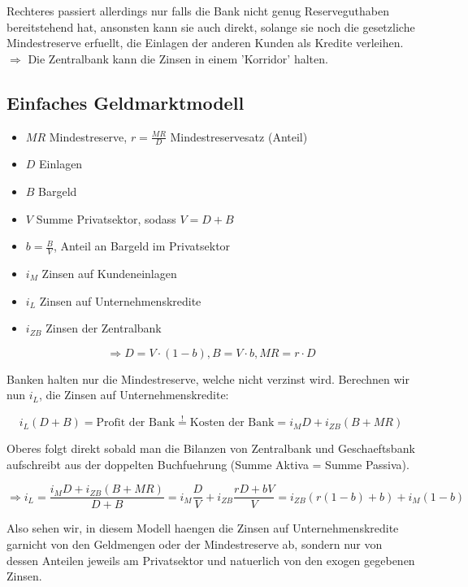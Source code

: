 \documentclass[a4paper]{article}
\begin{document}
Rechteres passiert allerdings nur falls die Bank nicht genug Reserveguthaben
bereitstehend hat, ansonsten kann sie auch direkt,
solange sie noch die gesetzliche Mindestreserve erfuellt,
die Einlagen der anderen Kunden als Kredite verleihen. \\

$\Rightarrow$ Die Zentralbank kann die Zinsen in einem 'Korridor' halten.

\subsection{Einfaches Geldmarktmodell}

\begin{itemize}
	\item $MR$ Mindestreserve, $r = \frac{ MR }{ D }$ Mindestreservesatz (Anteil)
	\item $D$ Einlagen
	\item $B$ Bargeld
	\item $V$ Summe Privatsektor, sodass $V = D + B$
	\item $b = \frac{ B }{ V }$, Anteil an Bargeld im Privatsektor
	\item $i_M$ Zinsen auf Kundeneinlagen
	\item $i_L$ Zinsen auf Unternehmenskredite
	\item $i_{ZB}$ Zinsen der Zentralbank
\end{itemize}

\[
	\Rightarrow
	D = V \cdot (1 - b),
	B = V \cdot b,
	MR = r \cdot D
\]

Banken halten nur die Mindestreserve, welche nicht verzinst wird.
Berechnen wir nun $i_L$, die Zinsen auf Unternehmenskredite:

\[
	i_L (D + B) = \text{Profit der Bank}
	\overset{!} =
	\text{Kosten der Bank}
	=
	i_M D + i_{ZB} (B + MR)
\]

Oberes folgt direkt sobald man die Bilanzen von Zentralbank und Geschaeftsbank
aufschreibt aus der doppelten Buchfuehrung (Summe Aktiva = Summe Passiva).

\[
	\Rightarrow i_L = \frac{ i_M D + i_{ZB} (B + MR) }{ D + B } =
	i_M \frac{ D }{ V } + i_{ZB} \frac{ rD + bV }{ V } =
	i_{ZB} \left(
	r (1-b) + b
	\right) + i_M \left(
	1 - b
	\right)
\]

Also sehen wir, in diesem Modell haengen die Zinsen auf Unternehmenskredite
garnicht von den Geldmengen oder der Mindestreserve ab, sondern nur von dessen
Anteilen jeweils am Privatsektor und natuerlich von den exogen gegebenen Zinsen. \\
\end{document}
